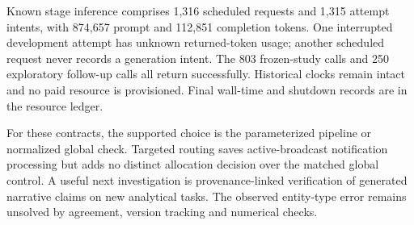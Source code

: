 Known stage inference comprises 1,316 scheduled requests and 1,315 attempt intents, with 874,657 prompt and 112,851 completion tokens. One interrupted development attempt has unknown returned-token usage; another scheduled request never records a generation intent. The 803 frozen-study calls and 250 exploratory follow-up calls all return successfully. Historical clocks remain intact and no paid resource is provisioned. Final wall-time and shutdown records are in the resource ledger.

For these contracts, the supported choice is the parameterized pipeline or normalized global check. Targeted routing saves active-broadcast notification processing but adds no distinct allocation decision over the matched global control. A useful next investigation is provenance-linked verification of generated narrative claims on new analytical tasks. The observed entity-type error remains unsolved by agreement, version tracking and numerical checks.

